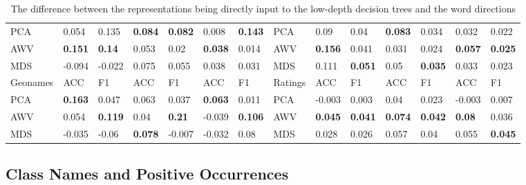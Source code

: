 \begin{landscape}
\begin{table}[]
\begin{tabular}{llllllllllllll}
		PCA        & 0.054          & 0.135          & \textbf{0.084} & \textbf{0.082} & 0.008          & \textbf{0.143} & PCA            & 0.09           & 0.04           & \textbf{0.083} & 0.034          & 0.032          & 0.022          \\
		AWV        & \textbf{0.151} & \textbf{0.14}  & 0.053          & 0.02           & \textbf{0.038} & 0.014          & AWV            & \textbf{0.156} & 0.041          & 0.031          & 0.024          & \textbf{0.057} & \textbf{0.025} \\
		MDS        & -0.094         & -0.022         & 0.075          & 0.055          & 0.038          & 0.031          & MDS            & 0.111          & \textbf{0.051} & 0.05           & \textbf{0.035} & 0.033          & 0.023          \\
		Geonames   & ACC            & F1             & ACC            & F1             & ACC            & F1             & Ratings        & ACC            & F1             & ACC            & F1             & ACC            & F1             \\
		PCA        & \textbf{0.163} & 0.047          & 0.063          & 0.037          & \textbf{0.063} & 0.011          & PCA            & -0.003         & 0.003          & 0.04           & 0.023          & -0.003         & 0.007          \\
		AWV        & 0.054          & \textbf{0.119} & 0.04           & \textbf{0.21}  & -0.039         & \textbf{0.106} & AWV            & \textbf{0.045} & \textbf{0.041} & \textbf{0.074} & \textbf{0.042} & \textbf{0.08}  & 0.036          \\
		MDS        & -0.035         & -0.06          & \textbf{0.078} & -0.007         & -0.032         & 0.08           & MDS            & 0.028          & 0.026          & 0.057          & 0.04           & 0.055          & \textbf{0.045}
	\end{tabular}
\caption{The difference between the representations being directly input to the low-depth decision trees and the word directions} \label{app:repandsingdirdiff}
\end{table}
\end{landscape}

\subsection{Class Names and Positive Occurrences}

